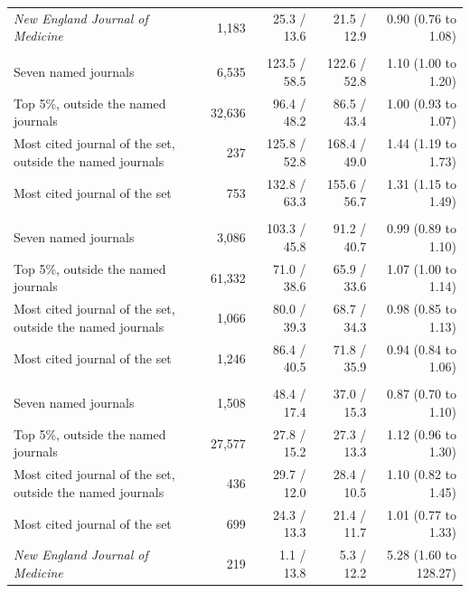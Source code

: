 \begin{table}[H]
\begin{tabularx}{\linewidth}{>{\raggedright\arraybackslash}Xrrrr}
\textit{New England Journal of Medicine} & 1,183 & 25.3 / 13.6 & 21.5 / 12.9 & 0.90 (0.76 to 1.08) \\
\multicolumn{5}{>{\raggedright\arraybackslash}p{\dimexpr\textwidth-2\tabcolsep\relax}}{\textit{Life Sciences}} \\
Seven named journals & 6,535 & 123.5 / 58.5 & 122.6 / 52.8 & 1.10 (1.00 to 1.20) \\
Top 5\%, outside the named journals & 32,636 & 96.4 / 48.2 & 86.5 / 43.4 & 1.00 (0.93 to 1.07) \\
Most cited journal of the set, outside the named journals & 237 & 125.8 / 52.8 & 168.4 / 49.0 & 1.44 (1.19 to 1.73) \\
Most cited journal of the set & 753 & 132.8 / 63.3 & 155.6 / 56.7 & 1.31 (1.15 to 1.49) \\
\multicolumn{5}{>{\raggedright\arraybackslash}p{\dimexpr\textwidth-2\tabcolsep\relax}}{\textit{Physical Sciences}} \\
Seven named journals & 3,086 & 103.3 / 45.8 & 91.2 / 40.7 & 0.99 (0.89 to 1.10) \\
Top 5\%, outside the named journals & 61,332 & 71.0 / 38.6 & 65.9 / 33.6 & 1.07 (1.00 to 1.14) \\
Most cited journal of the set, outside the named journals & 1,066 & 80.0 / 39.3 & 68.7 / 34.3 & 0.98 (0.85 to 1.13) \\
Most cited journal of the set & 1,246 & 86.4 / 40.5 & 71.8 / 35.9 & 0.94 (0.84 to 1.06) \\
\multicolumn{5}{>{\raggedright\arraybackslash}p{\dimexpr\textwidth-2\tabcolsep\relax}}{\textit{Social Sciences}} \\
Seven named journals & 1,508 & 48.4 / 17.4 & 37.0 / 15.3 & 0.87 (0.70 to 1.10) \\
Top 5\%, outside the named journals & 27,577 & 27.8 / 15.2 & 27.3 / 13.3 & 1.12 (0.96 to 1.30) \\
Most cited journal of the set, outside the named journals & 436 & 29.7 / 12.0 & 28.4 / 10.5 & 1.10 (0.82 to 1.45) \\
Most cited journal of the set & 699 & 24.3 / 13.3 & 21.4 / 11.7 & 1.01 (0.77 to 1.33) \\
\textit{New England Journal of Medicine} & 219 & 1.1 / 13.8 & 5.3 / 12.2 & 5.28 (1.60 to 128.27) \\
\bottomrule
\end{tabularx}
\end{table}
